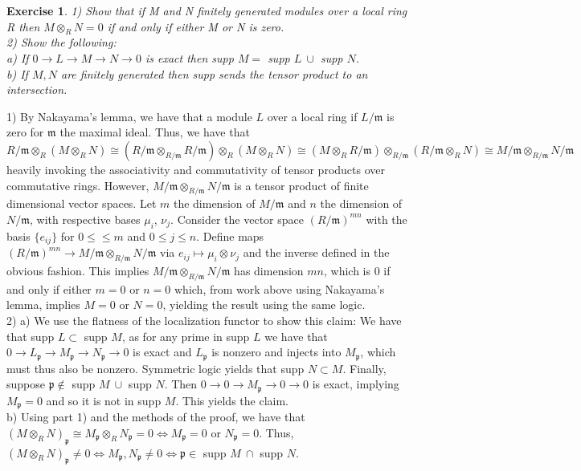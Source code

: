 \documentclass{article}
\newcommand{\fk}[1]{\mathfrak{#1}}
\newcommand{\iso}{\cong}
\newtheorem{exercise}{Exercise}
\begin{document}
\begin{exercise}
  1) Show that if M and N finitely generated modules over a local ring R then $M \otimes_{R}N =0$ if and only if either M or N is zero. \\
  2) Show the following: \\
  a) If $0\to L \to M \to N \to 0$ is exact then supp $M =$ supp $L \ \cup$ supp $N$. \\
  b) If $M, N$ are finitely generated then supp sends the tensor product to an intersection.
\end{exercise}
1) By Nakayama's lemma, we have that a module $L$ over a local ring if $L/\fk{m}$ is zero for $\fk{m}$ the maximal ideal. Thus, we have that $R/\fk{m} \otimes_{R}(M \otimes_{R} N) \iso (R/\fk{m} \otimes_{R/\fk{m}} R/\fk{m})\otimes_{R}(M \otimes_{R} N) \iso (M \otimes_{R} R/\fk{m}) \otimes_{R/\fk{m}}(R/\fk{m} \otimes_{R} N) \iso M/\fk{m} \otimes_{R/\fk{m}} N/\fk{m}$ heavily invoking the associativity and commutativity of tensor products over commutative rings. However, $M/\fk{m} \otimes_{R/\fk{m}}N/\fk{m}$ is a tensor product of finite dimensional vector spaces. Let $m$ the dimension of $M/\fk{m}$ and $n$ the dimension of $N/\fk{m}$, with respective bases $\mu_{i}$, $\nu_{j}$. Consider the vector space $(R/\fk{m})^{mn}$ with the basis $\{e_{ij}\}$ for $0\leq\leq m$ and $0 \leq j \leq n$. Define maps $(R/\fk{m})^{mn} \to  M/\fk{m} \otimes_{R/\fk{m}}N/\fk{m}$ via $e_{ij} \mapsto \mu_{i} \otimes \nu_{j}$ and the inverse defined in the obvious fashion. This implies  $M/\fk{m} \otimes_{R/\fk{m}}N/\fk{m}$ has dimension $mn$, which is 0 if and only if either $m = 0$ or $n = 0$ which, from work above using Nakayama's lemma, implies $M = 0$ or $N = 0$, yielding the result using the same logic. \\
2) a) We use the flatness of the localization functor to show this claim: We have that supp $L \subset$ supp $M$, as for any prime in supp $L$ we have that $0 \to L_{\fk{p}} \to M_{\fk{p}} \to N_{\fk{p}} \to 0$ is exact and $L_{\fk{p}}$ is nonzero and injects into $M_{\fk{p}}$, which must thus also be nonzero. Symmetric logic yields that supp $N \subset M$. Finally, suppose $\fk{p} \notin$ supp $M \ \cup$ supp $N$. Then $0 \to 0 \to M_{\fk{p}} \to 0 \to 0$ is exact, implying $M_{\fk{p}} = 0$ and so it is not in supp $M$. This yields the claim. \\
b) Using part 1) and the methods of the proof, we have that $(M \otimes_{R} N)_{\fk{p}} \iso M_{\fk{p}} \otimes_{R} N_{\fk{p}} = 0 \iff M_{\fk{p}} = 0$ or $N_{\fk{p}} = 0$. Thus, $(M \otimes_{R} N)_{\fk{p}} \neq 0 \iff M_{\fk{p}}, N_{\fk{p}} \neq 0 \iff \fk{p} \in$ supp $M \ \cap$ supp $N$. 
\end{document}
